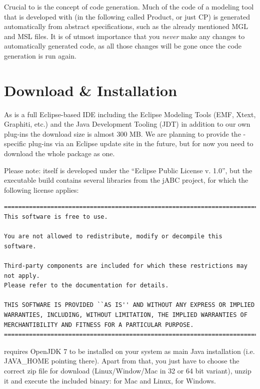 \documentclass[a4paper,american,12pt]{scrreprt}
\begin{document}
Crucial to \cinco is the concept of code generation. Much of the code of a
modeling tool that is developed with \cinco (in the following called \cinco
Product, or just CP) is generated automatically from abstract specifications,
such as the already mentioned MGL and MSL files. It is of utmost importance
that you \emph{never} make any changes to automatically generated
code\footnotemark{}, as all those changes will be gone once the code generation
is run again.


\section{Download \& Installation}

As \cinco{} is a full Eclipse-based IDE including the Eclipse Modeling Tools
(EMF, Xtext, Graphiti, etc.) and the Java Development Tooling (JDT) in addition
to our own plug-ins the download size is almost 300 MB. We are planning to
provide the \cinco{}-specific plug-ins via an Eclipse update site in the future,
but for now you need to download the whole package as one.

Please note: \cinco{} itself is developed under the ``Eclipse Public License v. 1.0'', 
but the executable build contains several libraries from the jABC
project, for which the following license applies:

\begin{verbatim}
===============================================================================
This software is free to use.

You are not allowed to redistribute, modify or decompile this software.

Third-party components are included for which these restrictions may not apply.
Please refer to the documentation for details.

THIS SOFTWARE IS PROVIDED ``AS IS'' AND WITHOUT ANY EXPRESS OR IMPLIED
WARRANTIES, INCLUDING, WITHOUT LIMITATION, THE IMPLIED WARRANTIES OF
MERCHANTIBILITY AND FITNESS FOR A PARTICULAR PURPOSE.
===============================================================================
\end{verbatim}

\cinco{} requires OpenJDK 7 to be installed on your system as main Java
installation (i.e. JAVA\_HOME pointing there). Apart from that, you just have to
choose the correct zip file for download (Linux/Window/Mac in 32 or 64 bit
variant), unzip it and execute the included binary:  for Mac and
Linux,  for Windows.
\end{document}

